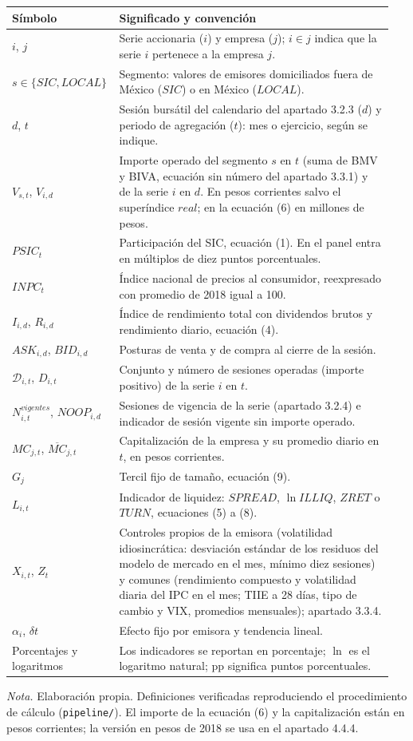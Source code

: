 \begin{longtable}{@{}p{0.24\linewidth}p{0.71\linewidth}@{}}
\toprule
\textbf{Símbolo} & \textbf{Significado y convención}\\
\midrule
\endhead
\bottomrule
\endlastfoot
$i$, $j$ & Serie accionaria ($i$) y empresa ($j$); $i\in j$ indica que la serie $i$ pertenece a la empresa $j$.\\
$s\in\{SIC, LOCAL\}$ & Segmento: valores de emisores domiciliados fuera de México ($SIC$) o en México ($LOCAL$).\\
$d$, $t$ & Sesión bursátil del calendario del apartado 3.2.3 ($d$) y periodo de agregación ($t$): mes o ejercicio, según se indique.\\
$V_{s,t}$, $V_{i,d}$ & Importe operado del segmento $s$ en $t$ (suma de BMV y BIVA, ecuación sin número del apartado 3.3.1) y de la serie $i$ en $d$. En pesos corrientes salvo el superíndice $real$; en la ecuación (6) en millones de pesos.\\
$PSIC_t$ & Participación del SIC, ecuación (1). En el panel entra en múltiplos de diez puntos porcentuales.\\
$INPC_t$ & Índice nacional de precios al consumidor, reexpresado con promedio de 2018 igual a 100.\\
$I_{i,d}$, $R_{i,d}$ & Índice de rendimiento total con dividendos brutos y rendimiento diario, ecuación (4).\\
$ASK_{i,d}$, $BID_{i,d}$ & Posturas de venta y de compra al cierre de la sesión.\\
$\mathcal{D}_{i,t}$, $D_{i,t}$ & Conjunto y número de sesiones operadas (importe positivo) de la serie $i$ en $t$.\\
$N^{vigentes}_{i,t}$, $NOOP_{i,d}$ & Sesiones de vigencia de la serie (apartado 3.2.4) e indicador de sesión vigente sin importe operado.\\
$MC_{j,t}$, $\overline{MC}_{j,t}$ & Capitalización de la empresa y su promedio diario en $t$, en pesos corrientes.\\
$G_j$ & Tercil fijo de tamaño, ecuación (9).\\
$L_{i,t}$ & Indicador de liquidez: $SPREAD$, $\ln ILLIQ$, $ZRET$ o $TURN$, ecuaciones (5) a (8).\\
$X_{i,t}$, $Z_t$ & Controles propios de la emisora (volatilidad idiosincrática: desviación estándar de los residuos del modelo de mercado en el mes, mínimo diez sesiones) y comunes (rendimiento compuesto y volatilidad diaria del IPC en el mes; TIIE a 28 días, tipo de cambio y VIX, promedios mensuales); apartado 3.3.4.\\
$\alpha_i$, $\delta t$ & Efecto fijo por emisora y tendencia lineal.\\
Porcentajes y logaritmos & Los indicadores se reportan en porcentaje; $\ln$ es el logaritmo natural; pp significa puntos porcentuales.\\
\end{longtable}
\emph{Nota.} Elaboración propia. Definiciones verificadas reproduciendo el procedimiento de cálculo (\texttt{pipeline/}). El importe de la ecuación (6) y la capitalización están en pesos corrientes; la versión en pesos de 2018 se usa en el apartado 4.4.4.

